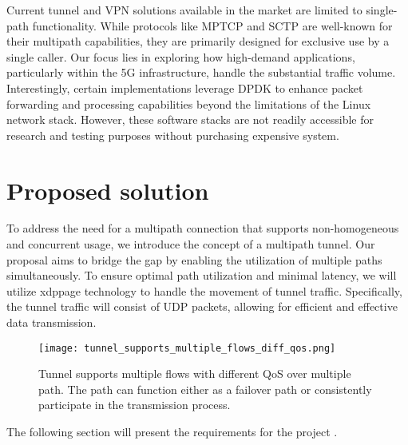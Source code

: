 Current tunnel and VPN solutions available in the market are limited to single-path functionality. While protocols like \ac{MPTCP} and \ac{SCTP} are well-known for their multipath capabilities, they are primarily designed for exclusive use by a single caller.
Our focus lies in exploring how high-demand applications, particularly within the 5G infrastructure, handle the substantial traffic volume. Interestingly, certain implementations leverage DPDK to enhance packet forwarding and processing capabilities beyond the limitations of the Linux network stack. However, these software stacks are not readily accessible for research and testing purposes without purchasing expensive system.

\section{Proposed solution}
To address the need for a multipath connection that supports non-homogeneous and concurrent usage, we introduce the concept of a multipath tunnel. 
Our proposal aims to bridge the gap by enabling the utilization of multiple paths simultaneously.
To ensure optimal path utilization and minimal latency, we will utilize \ac{xdppage} technology to handle the movement of tunnel traffic. 
Specifically, the tunnel traffic will consist of UDP packets, allowing for efficient and effective data transmission.

\begin{figure}[H]
	\centering
	\texttt{[image: tunnel\_supports\_multiple\_flows\_diff\_qos.png]}
	\caption{Tunnel supports multiple flows with different QoS over multiple path. The path can function either as a failover path or consistently participate in the transmission process.}\label{fig:reqs:tunnel_supports_multiple_flows_diff_qos}
\end{figure}

The following section will present the requirements for the project .

